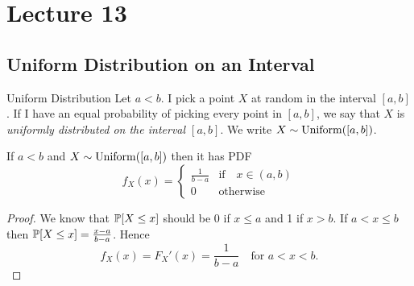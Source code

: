 \documentclass[class=article, crop=false]{standalone}
\begin{document}
  \section{Lecture 13}
  \subsection{Uniform Distribution on an Interval}
  \begin{definition}{Uniform Distribution}
    Let $a < b$. I pick a point $X$ at random in the interval $[a, b]$. If I have an equal probability of picking every point in $[a, b]$, we say that $X$ is \emph{uniformly distributed on the interval $[a, b]$}. We write $X\sim \Uniform([a, b])$.
  \end{definition}
  \begin{theorem}{}
    If $a < b$ and $X\sim\Uniform([a, b])$ then it has PDF
    \[
      f_X(x) = \begin{cases} \frac{1}{b-a} & \text{if}\quad x\in (a, b)\\0 & \text{otherwise}\end{cases}
    \]
    \begin{proof}
      We know that $\P[X \leq x]$ should be 0 if $x \leq a$ and 1 if $x > b$. If $a < x \leq b$ then $\P[X \leq x] = \frac{x - a}{b - a}$. Hence
      \[
        f_X(x) = F_X'(x) = \frac{1}{b - a}\quad \text{for } a < x < b.
      \]
    \end{proof}
  \end{theorem}
\end{document}
